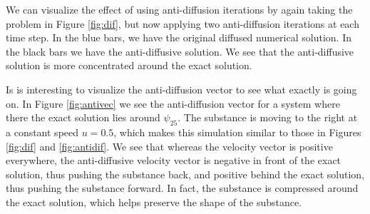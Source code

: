\documentclass[10pt, a4paper]{article}
\begin{document}
We can visualize the effect of using anti-diffusion iterations by again taking the problem in Figure \ref{fig:dif}, but now applying two anti-diffusion iterations at each time step. In the blue bars, we have the original diffused numerical solution. In the black bars we have the anti-diffusive solution. We see that the anti-diffusive solution is more concentrated around the exact solution.

Is is interesting to visualize the anti-diffusion vector to see what exactly is going on. In Figure \ref{fig:antivec} we see the anti-diffusion vector for a system where there the exact solution lies around $\psi_{25}$. The substance is moving to the right at a constant speed $u=0.5$, which makes this simulation similar to those in Figures \ref{fig:dif} and \ref{fig:antidif}. We see that whereas the velocity vector is positive everywhere, the anti-diffusive velocity vector is negative in front of the exact solution, thus pushing the substance back, and positive behind the exact solution, thus pushing the substance forward. In fact, the substance is compressed around the exact solution, which helps preserve the shape of the substance.
\end{document}
